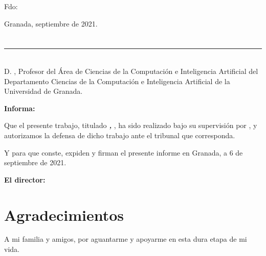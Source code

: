 \vspace{6cm}

\noindent Fdo: \myName

\vspace{2cm}

\begin{flushright}
Granada, septiembre de 2021.
\end{flushright}


\chapter*{}
\thispagestyle{empty}

\noindent\rule[-1ex]{\textwidth}{2pt}\\[4.5ex]

D. \textbf{\myProf}, Profesor del Área de Ciencias de la Computación e Inteligencia Artificial del Departamento Ciencias de la Computación e Inteligencia Artificial de la Universidad de Granada.

\vspace{0.5cm}

\textbf{Informa:}

\vspace{0.5cm}

Que el presente trabajo, titulado \textit{\textbf{\myTitle, \mySubtitle}},
ha sido realizado bajo su supervisión por \textbf{\myName}, y autorizamos la defensa de dicho trabajo ante el tribunal
que corresponda.

\vspace{0.5cm}

Y para que conste, expiden y firman el presente informe en Granada, a 6 de septiembre de 2021.

\vspace{1cm}

\textbf{El director:}

\vspace{5cm}

\noindent \textbf{\myProf}

\chapter*{Agradecimientos}
\thispagestyle{empty}

       \vspace{1cm}


A mi familia y amigos, por aguantarme y apoyarme en esta dura etapa de mi vida.


